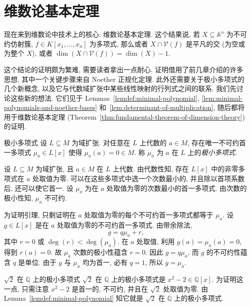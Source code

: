 \section{维数论基本定理}\label{sec:fundamental-theorem-of-dimension-theory}

现在来到维数论中技术上的核心: 维数论基本定理. 这个结果说, 若 $X\subseteq\mathbb{A}^{n}$ 为不可约仿射簇, $f\in K[x_{1},\ldots,x_{n}]$ 为多项式, 那么或者 $X\cap\mathcal{V}(f)$ 是平凡的交 (为空或为整个 $X$), 或者 $\dim(X\cap\mathcal{V}(f))=\dim(X)-1$.

这个结论的证明颇为繁难, 需要读者拿出一点耐心. 证明借用了前几章介绍的许多思想, 其中一个关键步骤来自 Noether 正规化定理. 此外还需要关于极小多项式的几个新概念, 以及它与代数域扩张中某些线性映射的行列式之间的联系. 我们先讨论这些新的想法. 它们见于 Lemmas~\ref{lemdef:minimal-polynomial}, \ref{lem:minimal-polynomials-and-noether-bases} 和~\ref{lem:determinant-of-multiplication}, 随后都将用于维数论基本定理 (Theorem~\ref{thm:fundamental-theorem-of-dimension-theory}) 的证明.

\begin{BookLemmaDefinition}{极小多项式}\leavevmode\label{lemdef:minimal-polynomial}
设 $L\subseteq M$ 为域扩张. 对任意在 $L$ 上代数的 $a\in M$, 存在唯一不可约首一多项式 $\mu_{a}\in L[x]$ 使得 $\mu_{a}(a)=0\in M$. 称 $\mu_{a}$ 为 $a$ 在 $L$ 上的\emph{极小多项式}.
\end{BookLemmaDefinition}
\begin{Proof}
设 $L\subseteq M$ 为域扩张, 且 $a\in M$ 在 $L$ 上代数. 由代数性知, 存在 $L[x]$ 中的非零多项式在 $a$ 处取值为零. 可以在这些多项式中选一个次数最小的, 并且除以首项系数后, 还可以使它首一. 设 $\mu_{a}$ 为在 $a$ 处取值为零的次数最小的首一多项式. 由次数的极小性知, $\mu_{a}$ 不可约.

为证明引理, 只剩证明在 $a$ 处取值为零的每个不可约首一多项式都等于 $\mu_{a}$. 设 $g\in L[x]$ 是在 $a$ 处取值为零的不可约首一多项式. 由带余除法,
\[
  g=q\mu_{a}+r,
\]
其中 $r=0$ 或 $\deg(r)<\deg(\mu_{a})$. 在 $a$ 处取值, 利用 $g(a)=\mu_{a}(a)=0$, 得到 $r(a)=0$. 故 $\mu_{a}$ 次数的极小性蕴含 $r=0$. 因此 $g=q\mu_{a}$, 而 $g$ 的不可约性蕴含 $q$ 是单位. 由于 $g$ 与 $\mu_{a}$ 均为首一, 必有 $q=1$, 所以 $g=\mu_{a}$.
\end{Proof}

\begin{Example}{$\sqrt{2}$ 在 $\mathbb{Q}$ 上的极小多项式}\leavevmode\label{ex:minimal-polynomial-of-square-root-two}
$\sqrt{2}$ 在 $\mathbb{Q}$ 上的极小多项式是 $x^{2}-2\in\mathbb{Q}[x]$. 为证明这一点, 只需注意 $x^{2}-2$ 是首一的, 不可约, 并且在 $\sqrt{2}$ 处取值为零. 由 Lemma~\ref{lemdef:minimal-polynomial} 知它就是 $\sqrt{2}$ 在 $\mathbb{Q}$ 上的极小多项式.
\end{Example}


